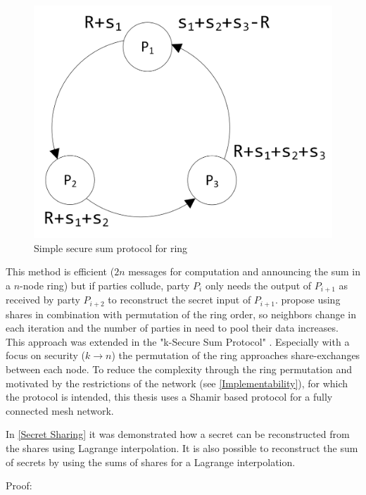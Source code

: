 \begin{figure}[!htb] %
	\caption{Simple secure sum protocol for ring} \label{figure:smpc sum ring}
	\includegraphics[scale=1.0]{figures/smpc-sum-simple-ring.png}
\end{figure}

This method is efficient ($2n$ messages for computation and announcing the sum in a $n$-node ring) but if parties collude, party $P_i$ only needs the output of $P_{i+1}$ as received by party $P_{i+2}$ to reconstruct the secret input of $P_{i+1}$. \textcite{Clifton2002} propose using shares in combination with permutation of the ring order, so neighbors change in each iteration and the number of parties in need to pool their data increases. This approach was extended in the "k-Secure Sum Protocol" \autocite{Sheikh2009}. Especially with a focus on security ($k\rightarrow n$) the permutation of the ring approaches share-exchanges between each node. To reduce the complexity through the ring permutation and motivated by the restrictions of the network (see \ref{Implementability}), for which the protocol is intended, this thesis  uses a Shamir based protocol for a fully connected mesh network. 

In \ref{Secret Sharing} it was demonstrated how a secret can be reconstructed from the shares using Lagrange interpolation. It is also possible to reconstruct the sum of secrets by using the sums of shares for a Lagrange interpolation.

Proof:

